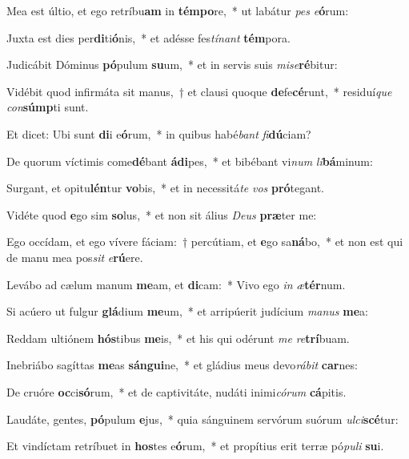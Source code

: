 \item Mea est últio, et ego retríbu\textbf{am} in \textbf{tém}\textbf{po}re,~* ut labátur \textit{pes} \textit{e}\textbf{ó}rum:
\item Juxta est dies per\textbf{di}ti\textbf{ó}nis,~* et adésse fes\textit{tí}\textit{nant} \textbf{tém}pora.
\item Judicábit Dóminus \textbf{pó}pulum \textbf{su}um,~* et in servis suis \textit{mi}\textit{se}\textbf{ré}bitur:
\item Vidébit quod infirmáta sit manus,~† et clausi quoque \textbf{de}fe\textbf{cé}runt,~* residuí\textit{que} \textit{con}\textbf{súmp}ti sunt.
\item Et dicet: Ubi sunt \textbf{di}i e\textbf{ó}rum,~* in quibus habé\textit{bant} \textit{fi}\textbf{dú}ciam?
\item De quorum víctimis come\textbf{dé}bant \textbf{á}\textbf{di}pes,~* et bibébant vi\textit{num} \textit{li}\textbf{bá}minum:
\item Surgant, et opitu\textbf{lén}tur \textbf{vo}bis,~* et in necessitá\textit{te} \textit{vos} \textbf{pró}tegant.
\item Vidéte quod \textbf{e}go sim \textbf{so}lus,~* et non sit álius \textit{De}\textit{us} \textbf{præ}ter me:
\item Ego occídam, et ego vívere fáciam:~† percútiam, et \textbf{e}go sa\textbf{ná}bo,~* et non est qui de manu mea pos\textit{sit} \textit{e}\textbf{rú}ere.
\item Levábo ad cælum manum \textbf{me}am, et \textbf{di}cam:~* Vivo ego \textit{in} \textit{æ}\textbf{tér}num.
\item Si acúero ut fulgur \textbf{glá}dium \textbf{me}um,~* et arripúerit judícium \textit{ma}\textit{nus} \textbf{me}a:
\item Reddam ultiónem \textbf{hós}tibus \textbf{me}is,~* et his qui odérunt \textit{me} \textit{re}\textbf{trí}buam.
\item Inebriábo sagíttas \textbf{me}as \textbf{sán}\textbf{gui}ne,~* et gládius meus devo\textit{rá}\textit{bit} \textbf{car}nes:
\item De cruóre \textbf{oc}ci\textbf{só}rum,~* et de captivitáte, nudáti inimi\textit{có}\textit{rum} \textbf{cá}pitis.
\item Laudáte, gentes, \textbf{pó}pulum \textbf{e}jus,~* quia sánguinem servórum suórum \textit{ul}\textit{ci}\textbf{scé}tur:
\item Et vindíctam retríbuet in \textbf{hos}tes e\textbf{ó}rum,~* et propítius erit terræ pó\textit{pu}\textit{li} \textbf{su}i.
